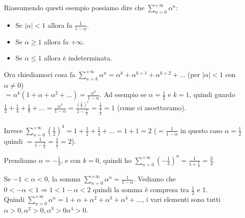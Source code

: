 Riassumendo questi esempio possiamo dire che $\sum\limits_{n=0}^{+\infty}\alpha^n$:
\vspace{-15pt}
\begin{itemize}
    \item Se $|\alpha| < 1$ allora fa $\frac{1}{1 - \alpha}$.
    \item Se $\alpha \geq 1$ allora fa $+\infty$.
    \item Se $\alpha \leq 1$ allora è indeterminata.
\end{itemize}
Ora chiediamoci cosa fa $\sum_{n=k}^{+\infty}\alpha^n = \alpha^k + \alpha^{k+1} + \alpha^{k+2} + ...$ (per $|\alpha| < 1$ con $\alpha \neq 0$) \\$= \alpha^k (1 + \alpha + \alpha^2 + ...) = \frac{\alpha^k}{1 - \alpha}$. Ad esempio se $\alpha = \frac{1}{2}$ e $k=1$, quindi guardo $\frac{1}{2} + \frac{1}{4} + \frac{1}{8} + ... = \frac{\alpha^k}{1 - \alpha} = \frac{(\frac{1}{2})^1}{1 -\frac{1}{2}} = \frac{\frac{1}{2}}{\frac{1}{2}} = 1$ (come ci asoettavamo).\\\\
Invece $\sum_{n=0}^{+\infty}(\frac{1}{2})^4 = 1 + \frac{1}{2} + \frac{1}{4} + ... = 1 + 1 = 2$ ($= \frac{1}{1 - \alpha}$ in questo caso $\alpha = \frac{1}{2}$ quindi $= \frac{1}{1 - \frac{1}{2}} = \frac{1}{\frac{1}{2}} = 2$).

\begin{example}
Prendiamo $\alpha = -\frac{1}{3}$, e con $k = 0$, quindi ho $\sum_{n=0}^{+\infty}(-\frac{1}{3})^n = \frac{1}{1 + \frac{1}{3}} = \frac{3}{4}$.
\end{example}

\begin{observation}
Se $-1 < \alpha < 0$, la somma $\sum_{n=0}^{+\infty}\alpha^n = \frac{1}{1 - \alpha}$. Vediamo che $0 < -\alpha < 1 \Longrightarrow 1 < 1 - \alpha < 2$ quindi la somma è compresa tra $\frac{1}{2}$ e 1. \\
Quindi $\sum_{n=0}^{+\infty} \alpha^n = 1 + \alpha + \alpha^2 + \alpha^3 + \alpha^4 + ...$, i vari elementi sono tutti $\alpha > 0, \alpha^2 > 0, \alpha^3 > 0 \alpha^4 > 0$.
\end{observation}

